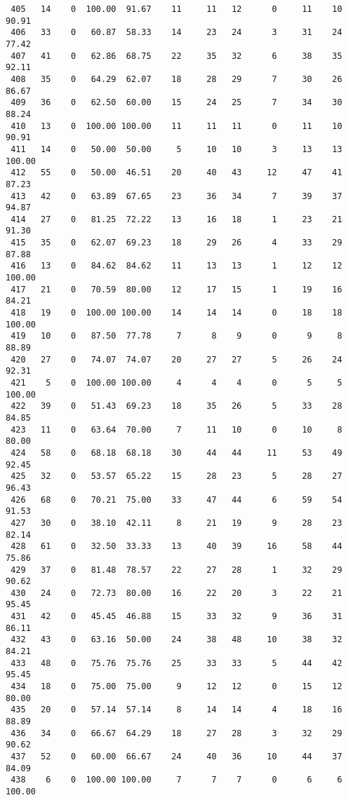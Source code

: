 \begin{verbatim}
 405   14    0  100.00  91.67    11     11   12      0     11    10    90.91
 406   33    0   60.87  58.33    14     23   24      3     31    24    77.42
 407   41    0   62.86  68.75    22     35   32      6     38    35    92.11
 408   35    0   64.29  62.07    18     28   29      7     30    26    86.67
 409   36    0   62.50  60.00    15     24   25      7     34    30    88.24
 410   13    0  100.00 100.00    11     11   11      0     11    10    90.91
 411   14    0   50.00  50.00     5     10   10      3     13    13   100.00
 412   55    0   50.00  46.51    20     40   43     12     47    41    87.23
 413   42    0   63.89  67.65    23     36   34      7     39    37    94.87
 414   27    0   81.25  72.22    13     16   18      1     23    21    91.30
 415   35    0   62.07  69.23    18     29   26      4     33    29    87.88
 416   13    0   84.62  84.62    11     13   13      1     12    12   100.00
 417   21    0   70.59  80.00    12     17   15      1     19    16    84.21
 418   19    0  100.00 100.00    14     14   14      0     18    18   100.00
 419   10    0   87.50  77.78     7      8    9      0      9     8    88.89
 420   27    0   74.07  74.07    20     27   27      5     26    24    92.31
 421    5    0  100.00 100.00     4      4    4      0      5     5   100.00
 422   39    0   51.43  69.23    18     35   26      5     33    28    84.85
 423   11    0   63.64  70.00     7     11   10      0     10     8    80.00
 424   58    0   68.18  68.18    30     44   44     11     53    49    92.45
 425   32    0   53.57  65.22    15     28   23      5     28    27    96.43
 426   68    0   70.21  75.00    33     47   44      6     59    54    91.53
 427   30    0   38.10  42.11     8     21   19      9     28    23    82.14
 428   61    0   32.50  33.33    13     40   39     16     58    44    75.86
 429   37    0   81.48  78.57    22     27   28      1     32    29    90.62
 430   24    0   72.73  80.00    16     22   20      3     22    21    95.45
 431   42    0   45.45  46.88    15     33   32      9     36    31    86.11
 432   43    0   63.16  50.00    24     38   48     10     38    32    84.21
 433   48    0   75.76  75.76    25     33   33      5     44    42    95.45
 434   18    0   75.00  75.00     9     12   12      0     15    12    80.00
 435   20    0   57.14  57.14     8     14   14      4     18    16    88.89
 436   34    0   66.67  64.29    18     27   28      3     32    29    90.62
 437   52    0   60.00  66.67    24     40   36     10     44    37    84.09
 438    6    0  100.00 100.00     7      7    7      0      6     6   100.00

\end{verbatim}
